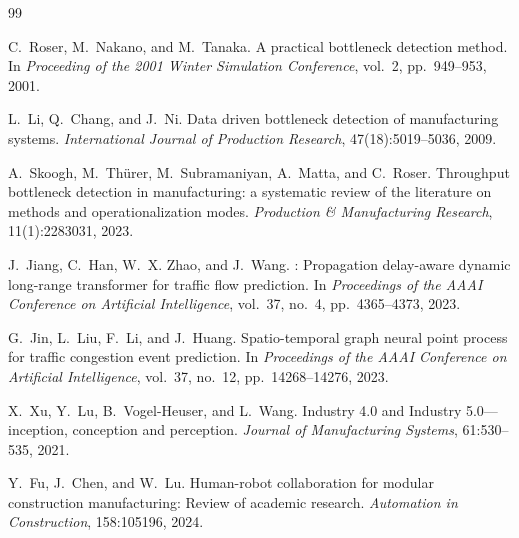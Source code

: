 \documentclass[12pt,a4paper,oneside,scheme=plain]{ctexrep}
\begin{document}
\begin{thebibliography}{99}

C.~Roser, M.~Nakano, and M.~Tanaka.
\newblock A practical bottleneck detection method.
\newblock In \emph{Proceeding of the 2001 Winter Simulation Conference}, vol.~2, pp.~949--953, 2001.

L.~Li, Q.~Chang, and J.~Ni.
\newblock Data driven bottleneck detection of manufacturing systems.
\newblock \emph{International Journal of Production Research}, 47(18):5019--5036, 2009.

A.~Skoogh, M.~Th{\"u}rer, M.~Subramaniyan, A.~Matta, and C.~Roser.
\newblock Throughput bottleneck detection in manufacturing: a systematic review of the literature on methods and operationalization modes.
\newblock \emph{Production \& Manufacturing Research}, 11(1):2283031, 2023.

J.~Jiang, C.~Han, W.~X. Zhao, and J.~Wang.
: Propagation delay-aware dynamic long-range transformer for traffic flow prediction.
\newblock In \emph{Proceedings of the AAAI Conference on Artificial Intelligence}, vol.~37, no.~4, pp.~4365--4373, 2023.

G.~Jin, L.~Liu, F.~Li, and J.~Huang.
\newblock Spatio-temporal graph neural point process for traffic congestion event prediction.
\newblock In \emph{Proceedings of the AAAI Conference on Artificial Intelligence}, vol.~37, no.~12, pp.~14268--14276, 2023.

X.~Xu, Y.~Lu, B.~Vogel-Heuser, and L.~Wang.
\newblock Industry 4.0 and Industry 5.0---inception, conception and perception.
\newblock \emph{Journal of Manufacturing Systems}, 61:530--535, 2021.

Y.~Fu, J.~Chen, and W.~Lu.
\newblock Human-robot collaboration for modular construction manufacturing: Review of academic research.
\newblock \emph{Automation in Construction}, 158:105196, 2024.

\end{thebibliography}
\end{document}
